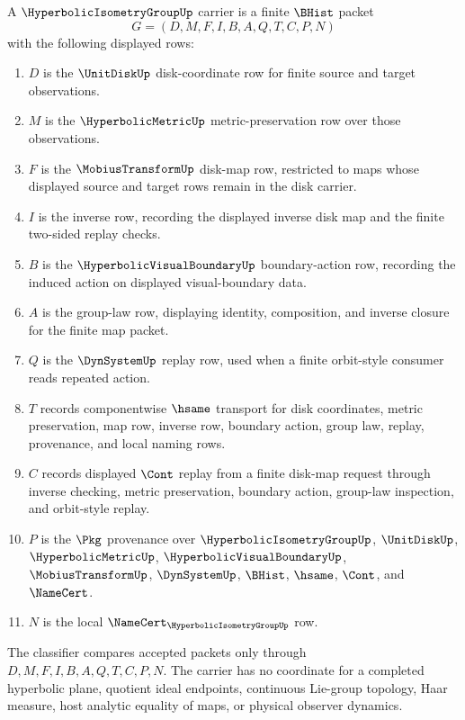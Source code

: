 \begin{definition}
\label{def:hyperbolic-isometry-group-carrier}
A $\HyperbolicIsometryGroupUp$ carrier is a finite $\BHist$ packet
$$
G=(D,M,F,I,B,A,Q,T,C,P,N)
$$
with the following displayed rows:
\begin{enumerate}
\item $D$ is the $\UnitDiskUp$ disk-coordinate row for finite source and target observations.
\item $M$ is the $\HyperbolicMetricUp$ metric-preservation row over those observations.
\item $F$ is the $\MobiusTransformUp$ disk-map row, restricted to maps whose displayed source and target rows remain in the disk carrier.
\item $I$ is the inverse row, recording the displayed inverse disk map and the finite two-sided replay checks.
\item $B$ is the $\HyperbolicVisualBoundaryUp$ boundary-action row, recording the induced action on displayed visual-boundary data.
\item $A$ is the group-law row, displaying identity, composition, and inverse closure for the finite map packet.
\item $Q$ is the $\DynSystemUp$ replay row, used when a finite orbit-style consumer reads repeated action.
\item $T$ records componentwise $\hsame$ transport for disk coordinates, metric preservation, map row, inverse row, boundary action, group law, replay, provenance, and local naming rows.
\item $C$ records displayed $\Cont$ replay from a finite disk-map request through inverse checking, metric preservation, boundary action, group-law inspection, and orbit-style replay.
\item $P$ is the $\Pkg$ provenance over $\HyperbolicIsometryGroupUp$, $\UnitDiskUp$, $\HyperbolicMetricUp$, $\HyperbolicVisualBoundaryUp$, $\MobiusTransformUp$, $\DynSystemUp$, $\BHist$, $\hsame$, $\Cont$, and $\NameCert$.
\item $N$ is the local $\NameCert_{\HyperbolicIsometryGroupUp}$ row.
\end{enumerate}
The classifier compares accepted packets only through $D,M,F,I,B,A,Q,T,C,P,N$. The carrier has no coordinate for a completed hyperbolic plane, quotient ideal endpoints, continuous Lie-group topology, Haar measure, host analytic equality of maps, or physical observer dynamics.
\end{definition}

